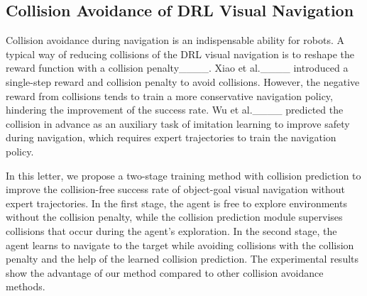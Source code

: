\subsection{Collision Avoidance of DRL Visual Navigation}
Collision avoidance during navigation is an indispensable ability for robots. A typical way of reducing collisions of the DRL visual navigation is to reshape the reward function with a collision penalty____. Xiao et al.____ introduced a single-step reward and collision penalty to avoid collisions. However, the negative reward from collisions tends to train a more conservative navigation policy, hindering the improvement of the success rate. Wu et al.____ predicted the collision in advance as an auxiliary task of imitation learning to improve safety during navigation, which requires expert trajectories to train the navigation policy. 

In this letter, we propose a two-stage training method with collision prediction to improve the collision-free success rate of object-goal visual navigation without expert trajectories. In the first stage, the agent is free to explore environments without the collision penalty, while the collision prediction module supervises collisions that occur during the agent's exploration. In the second stage, the agent learns to navigate to the target while avoiding collisions with the collision penalty and the help of the learned collision prediction. The experimental results show the advantage of our method compared to other collision avoidance methods.